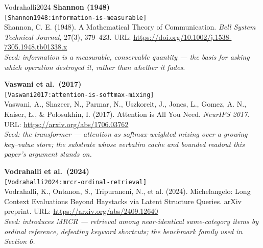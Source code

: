 \documentclass[11pt]{article}
\theoremstyle{remark}
\begin{document}
\begin{thebibliography}{Vodrahalli2024}
\textbf{Shannon (1948)}\\
{\small\texttt{[Shannon1948:information-is-measurable]}}\\
Shannon, C. E. (1948). A Mathematical Theory of Communication. \emph{Bell
System Technical Journal}, 27(3), 379--423.
URL: \url{https://doi.org/10.1002/j.1538-7305.1948.tb01338.x}\\
\emph{Seed: information is a measurable, conservable quantity --- the basis
for asking which operation destroyed it, rather than whether it fades.}

\textbf{Vaswani et al.\ (2017)}\\
{\small\texttt{[Vaswani2017:attention-is-softmax-mixing]}}\\
Vaswani, A., Shazeer, N., Parmar, N., Uszkoreit, J., Jones, L., Gomez, A. N.,
Kaiser, {\L}., \& Polosukhin, I. (2017). Attention is All You Need.
\emph{NeurIPS 2017}. URL: \url{https://arxiv.org/abs/1706.03762}\\
\emph{Seed: the transformer --- attention as softmax-weighted mixing over a
growing key--value store; the substrate whose verbatim cache and bounded
readout this paper's argument stands on.}

\textbf{Vodrahalli et al.\ (2024)}\\
{\small\texttt{[Vodrahalli2024:mrcr-ordinal-retrieval]}}\\
Vodrahalli, K., Ontanon, S., Tripuraneni, N., et al. (2024). Michelangelo:
Long Context Evaluations Beyond Haystacks via Latent Structure Queries.
arXiv preprint. URL: \url{https://arxiv.org/abs/2409.12640}\\
\emph{Seed: introduces MRCR --- retrieval among near-identical same-category
items by ordinal reference, defeating keyword shortcuts; the benchmark family
used in Section 6.}

\end{thebibliography}


\end{document}
